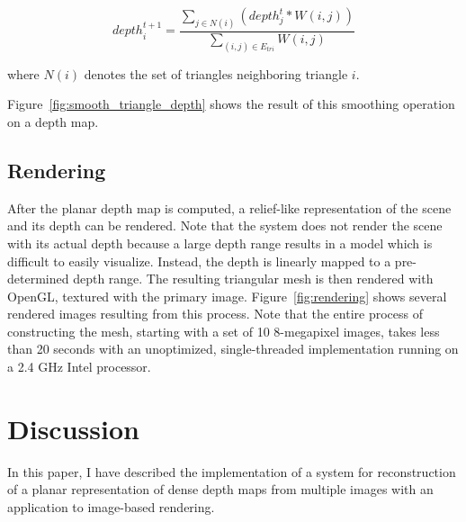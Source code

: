 \documentclass[conference]{acmsiggraph}
\begin{document}
\begin{equation}
    \label{eq:smoothing}
    depth_i^{t + 1} = \dfrac{
        \sum_{j \in N(i)}
        \left(
            depth_j^{t} * W(i, j)
        \right)
    }
    {
        \sum_{(i, j) \in E_{tri}}
            W(i, j)
    }
\end{equation}

where $N(i)$ denotes the set of triangles neighboring triangle $i$.

Figure~\ref{fig:smooth_triangle_depth} shows the result of this smoothing
operation on a depth map.

\subsection{Rendering}

After the planar depth map is computed, a relief-like representation
of the scene and its depth can be rendered.  Note that the system
does not render the scene with its actual depth because a large
depth range results in a model which is difficult to easily visualize.
Instead, the depth is linearly mapped to a pre-determined depth range.
The resulting triangular mesh is then rendered with OpenGL, textured
with the primary image.
Figure~\ref{fig:rendering} shows several rendered images resulting
from this process.  Note that the entire process of constructing the
mesh, starting with a set of 10 8-megapixel images, takes less
than 20 seconds with an unoptimized, single-threaded implementation
running on a 2.4 GHz Intel processor.

\section{Discussion}

In this paper, I have described the implementation of a system for
reconstruction of a planar representation of dense depth maps from multiple images
with an application to image-based rendering.

\end{document}
